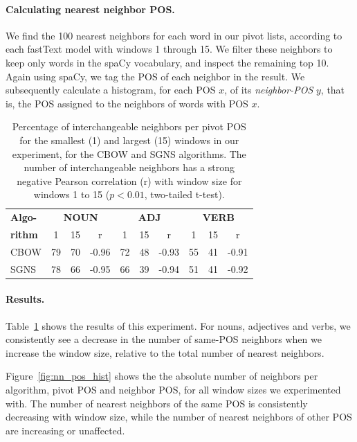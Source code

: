 \documentclass[11pt,a4paper]{article}
\begin{document}
    \paragraph{Calculating nearest neighbor POS.}
    
    We find the 100 nearest neighbors for each word in our pivot lists,
    according to each fastText model with windows 1 through 15.
    We filter these neighbors to
    keep only words in the spaCy vocabulary, and inspect the remaining top 10.
    Again using spaCy, we tag the POS of each neighbor in the result.
    We subsequently calculate a histogram, for each POS $x$, of its
    \textit{neighbor-POS} $y$, that is, the POS assigned to the neighbors of
    words with POS $x$.
    
    \begin{table}[t]
    \centering
    \setlength\tabcolsep{2.5pt}
    \begin{tabular}{l|ccc|ccc|ccc}
    {\bf Algo-} & \multicolumn{3}{c|}{\bf NOUN} & \multicolumn{3}{c|}{\bf ADJ} & \multicolumn{3}{c}{\bf VERB} \\
    {\bf rithm} & 1 & 15 & r & 1 & 15 & r & 1 & 15 & r \\
    \hline
    CBOW & 79 & 70 & -0.96 & 72 & 48 & -0.93 & 55 & 41 & -0.91 \\
    SGNS & 78 & 66 & -0.95 & 66 & 39 & -0.94 & 51 & 41 & -0.92 
    \end{tabular}
    \caption{Percentage of interchangeable neighbors per pivot POS for the smallest (1) and largest (15)
        windows in our experiment, for the CBOW and SGNS algorithms.
        The number of interchangeable neighbors has a strong negative Pearson correlation (r) with window size
        for windows 1 to 15 ($p<0.01$, two-tailed t-test).\label{tab:nn_pos_hist}}
    \end{table}
    
    \paragraph{Results.}
    
    Table~\ref{tab:nn_pos_hist} shows the results of this experiment.
    For nouns, adjectives and verbs, we consistently see a decrease in
    the  number of same-POS neighbors when we increase the window size,
    relative to the total number of nearest
    neighbors.
    
    
    Figure~\ref{fig:nn_pos_hist} shows the the absolute number of neighbors per algorithm,
    pivot POS and neighbor POS, for all window sizes we experimented with.
    The number of nearest neighbors of the same POS is consistently decreasing with window size,
    while the number of nearest neighbors of other POS are increasing or unaffected.
    
\end{document}
